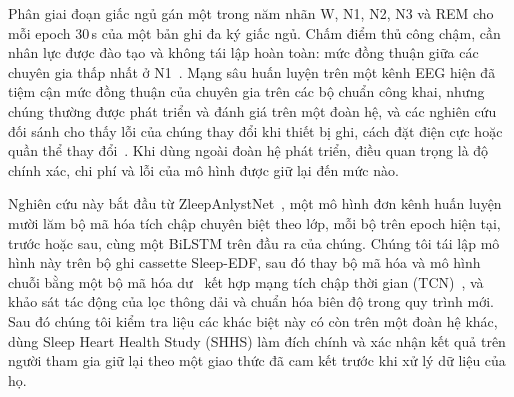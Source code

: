 \documentclass[11pt,a4paper]{article}
\begin{document}
Phân giai đoạn giấc ngủ gán một trong năm nhãn W, N1, N2, N3 và REM cho mỗi epoch 30\,s của một bản ghi đa ký
giấc ngủ. Chấm điểm thủ công chậm, cần nhân lực được đào tạo và không tái lập hoàn toàn: mức đồng thuận giữa
các chuyên gia thấp nhất ở N1~\cite{rosenberg2013aasm}. Mạng sâu huấn luyện trên một kênh EEG hiện đã tiệm
cận mức đồng thuận của chuyên gia trên các bộ chuẩn công khai, nhưng chúng thường được phát triển và đánh giá
trên một đoàn hệ, và các nghiên cứu đối sánh cho thấy lỗi của chúng thay đổi khi thiết bị ghi, cách đặt điện
cực hoặc quần thể thay đổi~\cite{deirossi2025sleepyland}. Khi dùng ngoài đoàn hệ phát triển, điều quan trọng
là độ chính xác, chi phí và lỗi của mô hình được giữ lại đến mức nào.

Nghiên cứu này bắt đầu từ ZleepAnlystNet~\cite{jadhav2024zleepanlystnet}, một mô hình đơn kênh huấn luyện
mười lăm bộ mã hóa tích chập chuyên biệt theo lớp, mỗi bộ trên epoch hiện tại, trước hoặc sau, cùng một BiLSTM
trên đầu ra của chúng. Chúng tôi tái lập mô hình này trên bộ ghi cassette Sleep-EDF, sau đó thay bộ mã hóa và
mô hình chuỗi bằng một bộ mã hóa dư~\cite{he2016resnet} kết hợp mạng tích chập thời gian
(TCN)~\cite{bai2018tcn}, và khảo sát tác động của lọc thông dải và chuẩn hóa biên độ trong quy trình mới. Sau
đó chúng tôi kiểm tra liệu các khác biệt này có còn trên một đoàn hệ khác, dùng Sleep Heart Health Study
(SHHS) làm đích chính và xác nhận kết quả trên người tham gia giữ lại theo một giao thức đã cam kết trước khi
xử lý dữ liệu của họ.
\end{document}
